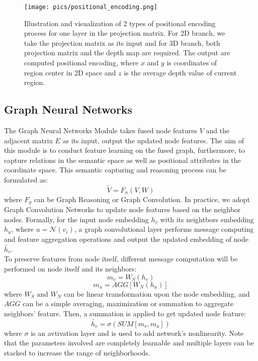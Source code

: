 \documentclass[journal]{IEEEtran}
\begin{document}
    
    \begin{figure}
        \centering
        \texttt{[image: pics/positional\_encoding.png]}
        \caption{Illustration and visualization of 2 types of positional encoding process for one
        layer in the projection matrix. For 2D branch, we take the projection matrix as its input and for 3D branch, both projection matrix and the depth map are required. The output are computed positional encoding, where $x$ and $y$ is coordinates of region center in 2D space and $z$ is the average depth value of current region. }
        \label{fig_pos_encoding}
    \end{figure}  



\subsection{Graph Neural Networks}
 
    The Graph Neural Networks Module takes fused node features $V$ and the adjacent matrix $E$ as its input, output the updated node features. The aim of this module is to conduct feature learning on the fused graph, furthermore, to capture relations in the semantic space as well as positional attributes in the coordinate space. This semantic capturing and reasoning process can be formulated as:
    \begin{equation}
        \tilde{V} = F_n(V, W)
    \end{equation}
    where  $F_g$ can be Graph Reasoning or Graph Convolution. In practice, we adopt Graph Convolution Networks \cite{kipf2016GCN} to update node features based on the neighbor nodes. Formally, for the input node embedding $h_v$ with its neightbors embedding $h_u$, where $u={\mathcal{N}(v_i)}$, a graph convolutional layer performs message computing and feature aggregation operations and output the updated embedding of node $\tilde{h_{v}}$. \\   

 
    To preserve features from node itself, different message computation will be performed on node itself and its neighbors:
    \begin{equation}
        m_{v} = W_{S}(h_v)
    \end{equation}
    \begin{equation}
        m_{u} = AGG[W_{N}(h_u)]
    \end{equation}
    where $W_S$ and $W_N$ can be linear transformation upon the node embedding, and $AGG$ can be a simple averaging, maximization or summation to aggregate neighbors' feature. Then, a summation is applied to get updated node feature:
    \begin{equation}
        \tilde{h_{v}} = \sigma(SUM[m_{v}, m_{u}])
    \end{equation}
    where $\sigma$ is an avtivation layer and is used to add network's nonlinearity. Note that the parameters involved are completely learnable and multiple layers can be stacked to increase the range of neighborhoods.
    \\   
\end{document}
